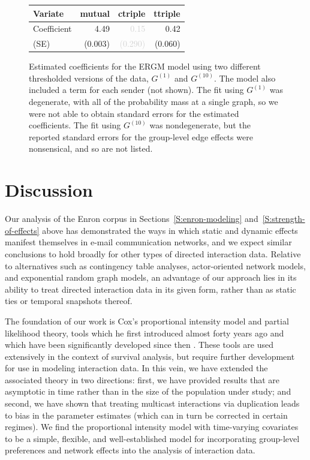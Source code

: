 \documentclass[final]{statsoc}
\begin{document}
\begin{figure}
{  \begin{tabular}{lrrr}
  \toprule
  Variate
  & \textbf{mutual}
  & \textbf{ctriple}
  & \textbf{ttriple}
  \\
  \midrule
  Coefficient
  & 4.49
  & \textcolor{LightGray}{0.15}
  & 0.42
  \\
  (SE)
  & \tiny{(0.003)}
  & \textcolor{LightGray}{\tiny{(0.290)}}
  & \tiny{(0.060)}
  \\
  \bottomrule
  \end{tabular}
}
\normalsize
\caption{Estimated coefficients for the ERGM model using two different
thresholded versions of the data, $G^{(1)}$ and $G^{(10)}$.  The model also included a
term for each sender (not shown).
The fit using $G^{(1)}$ was degenerate, with all of the probability mass at a
single graph, so we were not able to obtain standard errors for the estimated
coefficients.  The fit using $G^{(10)}$ was nondegenerate, but the reported
standard errors for the group-level edge effects were nonsensical, and so are not listed.
}
\end{figure}

\FloatBarrier

\section{Discussion}\label{S:discussion}

Our analysis of the Enron corpus in Sections~\ref{S:enron-modeling} and~\ref{S:strength-of-effects} above
has demonstrated the ways in which static and dynamic effects manifest
themselves in e-mail communication networks, and we expect similar
conclusions to hold broadly for other types of directed interaction
data.  Relative to alternatives such as contingency table analyses,
actor-oriented network models, and
exponential random graph models, an
advantage of our approach lies in its ability to treat directed
interaction data in its given form, rather than as static ties or
temporal snapshots thereof.

The foundation of our work is Cox's \citeyearpar{cox1972regression}
proportional intensity model and partial likelihood theory, tools
which he first introduced almost forty years ago and which have been
significantly developed since then \citep{cox1975partial,
fleming1991counting, andersen1993statistical, martinussen2006dynamic,
cook2007statistical}. These tools are used extensively in the context
of survival analysis, but require further development for use in
modeling interaction data. In this vein, we have extended the
associated theory in two directions: first, we have provided results
that are asymptotic in time rather than in the size of the population
under study; and second, we have shown that treating multicast
interactions via duplication leads to bias in the parameter estimates
(which can in turn be corrected in certain regimes).  We find the
proportional intensity model with time-varying covariates to be a
simple, flexible, and well-established model for incorporating
group-level preferences and network effects into the analysis of
interaction data.
\end{document}
